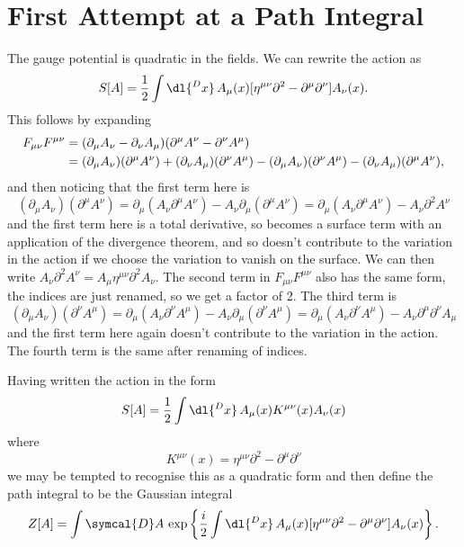 \documentclass[fleqn]{NotesClass}
\newcommand{\minkowskiMetric}{\eta}
\newcommand{\dalembertian}{\partial^2}
\newcommand{\DL}[1]{\symcal{D}#1}
\begin{document}
    \section{First Attempt at a Path Integral}
    The gauge potential is quadratic in the fields.
    We can rewrite the action as
    \begin{equation}
        S[A] = \frac{1}{2} \int \dl{^Dx} \, A_\mu(x) [\minkowskiMetric^{\mu\nu}\dalembertian - \partial^\mu \partial^\nu] A_\nu(x).
    \end{equation}
    This follows by expanding 
    \begin{align}
        F_{\mu\nu}F^{\mu\nu} &= (\partial_\mu A_\nu - \partial_\nu A_\mu)(\partial^\mu A^\nu - \partial^\nu A^\mu)\\
        &= (\partial_\mu A_\nu)(\partial^\mu A^\nu) + (\partial_\nu A_\mu) (\partial^\nu A^\mu) - (\partial_\mu A_\nu) (\partial^\nu A^\mu) - (\partial_\nu A_\mu)(\partial^\mu A^\nu), \notag
    \end{align}
    and then noticing that the first term here is
    \begin{equation}
        (\partial_\mu A_\nu)(\partial^\mu A^\nu) = \partial_\mu(A_\nu \partial^\mu A^\nu) - A_\nu \partial_\mu(\partial^\mu A^\nu) = \partial_\mu (A_\nu \partial^\mu A^\nu) - A_\nu \dalembertian A^\nu
    \end{equation}
    and the first term here is a total derivative, so becomes a surface term with an application of the divergence theorem, and so doesn't contribute to the variation in the action if we choose the variation to vanish on the surface.
    We can then write \(A_\nu \dalembertian A^\nu = A_\mu \minkowskiMetric^{\mu\nu} \dalembertian A_\nu\).
    The second term in \(F_{\mu\nu}F^{\mu\nu}\) also has the same form, the indices are just renamed, so we get a factor of 2.
    The third term is
    \begin{equation}
        (\partial_\mu A_\nu)(\partial^\nu A^\mu) = \partial_\mu (A_\nu \partial^\nu A^\mu) - A_\nu\partial_\mu(\partial^\nu A^\mu) = \partial_\mu (A_\nu \partial^\nu A^\mu) - A_\nu \partial^\mu \partial^\nu A_\mu
    \end{equation}
    and the first term here again doesn't contribute to the variation in the action.
    The fourth term is the same after renaming of indices.
    
    Having written the action in the form
    \begin{equation}
        S[A] = \frac{1}{2} \int \dl{^Dx} \, A_\mu(x) K^{\mu\nu}(x) A_\nu(x)
    \end{equation}
    where
    \begin{equation}
        K^{\mu\nu}(x) = \minkowskiMetric^{\mu\nu} \dalembertian - \partial^\mu \partial^\nu
    \end{equation}
    we may be tempted to recognise this as a quadratic form and then define the path integral to be the Gaussian integral
    \begin{equation}
        Z[A] = \int \DL{A} \, \exp\left\{ \frac{i}{2} \int \dl{^Dx} \, A_\mu(x) [\minkowskiMetric^{\mu\nu} \dalembertian - \partial^\mu \partial^\nu] A_\nu(x)  \right\}.
    \end{equation}
    
\end{document}
